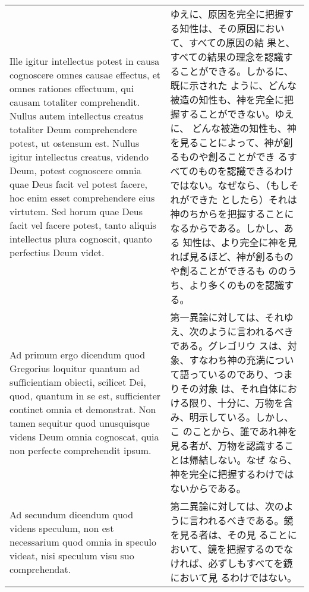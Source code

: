 \documentclass[10pt]{jsarticle} %
\begin{document}
\begin{longtable}{p{21em}p{21em}}
\\

Ille igitur intellectus potest in causa cognoscere omnes causae
effectus, et omnes rationes effectuum, qui causam totaliter
comprehendit. Nullus autem intellectus creatus totaliter Deum
comprehendere potest, ut ostensum est. Nullus igitur intellectus
creatus, videndo Deum, potest cognoscere omnia quae Deus facit vel
potest facere, hoc enim esset comprehendere eius virtutem. Sed horum
quae Deus facit vel facere potest, tanto aliquis intellectus plura
cognoscit, quanto perfectius Deum videt.

&

ゆえに、原因を完全に把握する知性は、その原因において、すべての原因の結
果と、すべての結果の理念を認識することができる。しかるに、既に示された
ように、どんな被造の知性も、神を完全に把握することができない。ゆえに、
どんな被造の知性も、神を見ることによって、神が創るものや創ることができ
るすべてのものを認識できるわけではない。なぜなら、（もしそれができた
としたら）それは神のちからを把握することになるからである。しかし、ある
知性は、より完全に神を見れば見るほど、神が創るものや創ることができるも
ののうち、より多くのものを認識する。

\\

{\sc Ad primum ergo dicendum} quod Gregorius loquitur quantum ad
sufficientiam obiecti, scilicet Dei, quod, quantum in se est,
sufficienter continet omnia et demonstrat. Non tamen sequitur quod
unusquisque videns Deum omnia cognoscat, quia non perfecte
comprehendit ipsum.

&

第一異論に対しては、それゆえ、次のように言われるべきである。グレゴリウ
スは、対象、すなわち神の充満について語っているのであり、つまりその対象
は、それ自体における限り、十分に、万物を含み、明示している。しかし、こ
のことから、誰であれ神を見る者が、万物を認識することは帰結しない。なぜ
なら、神を完全に把握するわけではないからである。

\\

{\sc  Ad secundum dicendum} quod videns speculum, non est
 necessarium quod omnia in speculo videat, nisi speculum visu suo
 comprehendat.

&

第二異論に対しては、次のように言われるべきである。鏡を見る者は、その見
ることにおいて、鏡を把握するのでなければ、必ずしもすべてを鏡において見
るわけではない。

\\


\end{longtable}
\end{document}
